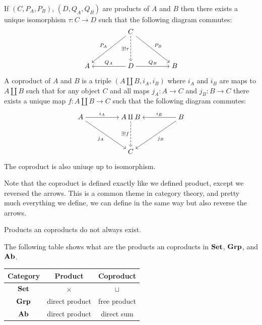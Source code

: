 \documentclass[11pt,a4paper]{article}
\newcommand{\ccoprod}{\amalg}
\begin{document}
\begin{exercise}
  If $(C,P_A,P_B)$, $(D,Q_A,Q_B)$ are products of $A$
  and $B$ then there exists a unique isomorphism $\tau \colon C \to D$
  such that the following diagram commutes:
  \[\begin{tikzcd}[ampersand replacement=\&,cramped]
    \&\& C \\
    \\
    A \&\& D \&\& B
    \arrow["{P_A}"', from=1-3, to=3-1]
    \arrow["{\exists ! \tau}"', dashed, from=1-3, to=3-3]
    \arrow["{P_B}", from=1-3, to=3-5]
    \arrow["{Q_A}"', from=3-3, to=3-1]
    \arrow["{Q_B}", from=3-3, to=3-5]
  \end{tikzcd}\]
\end{exercise}

\begin{definition}[Coproduct]
  A coproduct of $A$ and $B$ is a triple $(A \ccoprod B, i_A, i_B)$
  where $i_A$ and $i_B$ are maps to $A \ccoprod B$ such that for any object $C$
  and all maps $j_A \colon A \to C$ and $j_B \colon B \to C$
  there exists a unique map $f \colon A \ccoprod B \to C$ such that
  the following diagram commutes:
  \[\begin{tikzcd}[ampersand replacement=\&,cramped]
    A \&\& {A \ccoprod B} \&\& B \\
    \\
    \&\& C
    \arrow["{i_A}", from=1-1, to=1-3]
    \arrow["{j_A}"', from=1-1, to=3-3]
    \arrow["{\exists ! f}"', dashed, from=1-3, to=3-3]
    \arrow["{i_B}"', from=1-5, to=1-3]
    \arrow["{j_B}", from=1-5, to=3-3]
  \end{tikzcd}\]
\end{definition}
\begin{remark}
  The coproduct is also uniuqe up to isomorphism.
\end{remark}
\begin{remark}
  Note that the coproduct is defined exactly like we defined product,
  except we reversed the arrows.
  This is a common theme in category theory,
  and pretty much everything we define, we can define in the same
  way but also reverse the arrows.
\end{remark}

\begin{remark}
  Products an coproducts do not always exist.
\end{remark}

\begin{example}
  The following table shows what are the products an coproducts
  in $\mathbf{Set}$, $\mathbf{Grp}$, and $\mathbf{Ab}$.
  \begin{center}
    \begin{tabular}{c|c|c}
    Category & Product        & Coproduct    \\ \hline
    $\mathbf{Set}$   & $\times$       & $\sqcup$     \\
    $\mathbf{Grp}$   & direct product & free product \\
    $\mathbf{Ab}$    & direct product & direct sum   \\
    \end{tabular}
  \end{center}
\end{example}
\end{document}
